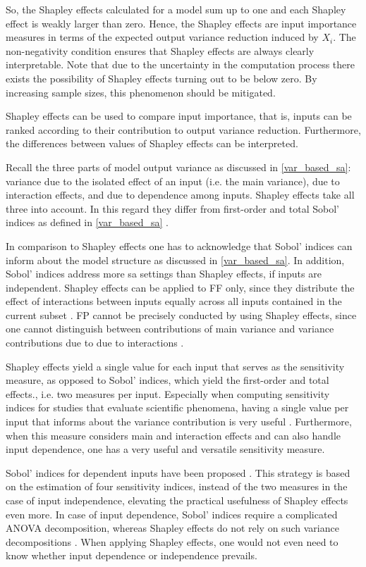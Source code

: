\noindent So, the Shapley effects calculated for a model sum up to one and each Shapley effect is weakly larger than zero. Hence, the Shapley effects are input importance measures in terms of the expected output variance reduction induced by $X_i$. The non-negativity condition ensures that Shapley effects are always clearly interpretable. Note that due to the uncertainty in the computation process there exists the possibility of Shapley effects turning out to be below zero. By increasing sample sizes, this phenomenon should be mitigated.

Shapley effects can be used to compare input importance, that is, inputs can be ranked according to their contribution to output variance reduction. Furthermore, the differences between values of Shapley effects can be interpreted.

Recall the three parts of model output variance as discussed in \cref{var_based_sa}: variance due to the isolated effect of an input (i.e. the main variance), due to interaction effects, and due to dependence among inputs. Shapley effects take all three into account. In this regard they differ from first-order and total Sobol' indices as defined in \cref{var_based_sa} \citep{O14}.

In comparison to Shapley effects one has to acknowledge that Sobol' indices can inform about the model structure as discussed in \cref{var_based_sa}. In addition, Sobol' indices address more sa settings than Shapley effects, if inputs are independent. Shapley effects can be applied to FF only, since they distribute the effect of interactions between inputs equally across all inputs contained in the current subset \citep{IP19}. FP cannot be precisely conducted by using Shapley effects, since one cannot distinguish between contributions of main variance and variance contributions due to due to interactions \citep{IP19}.

Shapley effects yield a single value for each input that serves as the sensitivity measure, as opposed to Sobol' indices, which yield the first-order and total effects., i.e. two measures per input. Especially when computing sensitivity indices for studies that evaluate scientific phenomena, having a single value per input that informs about the variance contribution is very useful \citep{SNS16}. Furthermore, when this measure considers main and interaction effects and can also handle input dependence, one has a very useful and versatile sensitivity measure.

Sobol' indices for dependent inputs have been proposed \citep{MTA15}. This strategy is based on the estimation of four sensitivity indices, instead of the two measures in the case of input independence, elevating the practical usefulness of Shapley effects even more. In case of input dependence, Sobol' indices require a complicated ANOVA decomposition, whereas Shapley effects do not rely on such variance decompositions \citep{IP19}. When applying Shapley effects, one would not even need to know whether input dependence or independence prevails.

